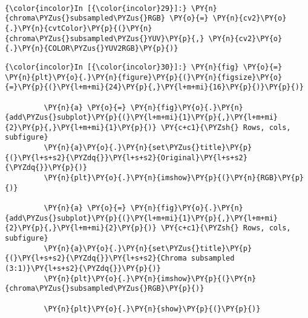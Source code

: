     \begin{center}
    \end{center}
    { \hspace*{\fill} \\}
    
    \begin{Verbatim}[commandchars=\\\{\}]
{\color{incolor}In [{\color{incolor}29}]:} \PY{n}{chroma\PYZus{}subsampled\PYZus{}RGB} \PY{o}{=} \PY{n}{cv2}\PY{o}{.}\PY{n}{cvtColor}\PY{p}{(}\PY{n}{chroma\PYZus{}subsampled\PYZus{}YUV}\PY{p}{,} \PY{n}{cv2}\PY{o}{.}\PY{n}{COLOR\PYZus{}YUV2RGB}\PY{p}{)}
\end{Verbatim}


    \begin{Verbatim}[commandchars=\\\{\}]
{\color{incolor}In [{\color{incolor}30}]:} \PY{n}{fig} \PY{o}{=} \PY{n}{plt}\PY{o}{.}\PY{n}{figure}\PY{p}{(}\PY{n}{figsize}\PY{o}{=}\PY{p}{(}\PY{l+m+mi}{24}\PY{p}{,}\PY{l+m+mi}{16}\PY{p}{)}\PY{p}{)}
         
         \PY{n}{a} \PY{o}{=} \PY{n}{fig}\PY{o}{.}\PY{n}{add\PYZus{}subplot}\PY{p}{(}\PY{l+m+mi}{1}\PY{p}{,}\PY{l+m+mi}{2}\PY{p}{,}\PY{l+m+mi}{1}\PY{p}{)} \PY{c+c1}{\PYZsh{} Rows, cols, subfigure}
         \PY{n}{a}\PY{o}{.}\PY{n}{set\PYZus{}title}\PY{p}{(}\PY{l+s+s2}{\PYZdq{}}\PY{l+s+s2}{Original}\PY{l+s+s2}{\PYZdq{}}\PY{p}{)}
         \PY{n}{plt}\PY{o}{.}\PY{n}{imshow}\PY{p}{(}\PY{n}{RGB}\PY{p}{)}
         
         \PY{n}{a} \PY{o}{=} \PY{n}{fig}\PY{o}{.}\PY{n}{add\PYZus{}subplot}\PY{p}{(}\PY{l+m+mi}{1}\PY{p}{,}\PY{l+m+mi}{2}\PY{p}{,}\PY{l+m+mi}{2}\PY{p}{)} \PY{c+c1}{\PYZsh{} Rows, cols, subfigure}
         \PY{n}{a}\PY{o}{.}\PY{n}{set\PYZus{}title}\PY{p}{(}\PY{l+s+s2}{\PYZdq{}}\PY{l+s+s2}{Chroma subsampled (3:1)}\PY{l+s+s2}{\PYZdq{}}\PY{p}{)}
         \PY{n}{plt}\PY{o}{.}\PY{n}{imshow}\PY{p}{(}\PY{n}{chroma\PYZus{}subsampled\PYZus{}RGB}\PY{p}{)}
         
         \PY{n}{plt}\PY{o}{.}\PY{n}{show}\PY{p}{(}\PY{p}{)}
\end{Verbatim}


    \begin{center}
    \end{center}
    { \hspace*{\fill} \\}
    
